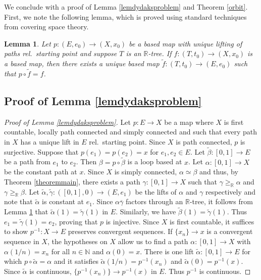 \documentclass[12pt, leqno]{amsart}
\newcommand{\ui}{[0,1]}
\newcommand{\wt}{\widetilde}
\newcommand{\bbn}{\mathbb{N}}
\newcommand{\bbr}{\mathbb{R}}
\newcommand{\ov}{\overline}
\newtheorem{lemma}[theorem]{Lemma}
\theoremstyle{definition}\newtheorem{definition}[theorem]{Definition}
\begin{document}
We conclude with a proof of Lemma \ref{lemdydaksproblem} and Theorem \ref{orbit}. First, we note the following lemma, which is proved using standard techniques from covering space theory.

\begin{lemma}\label{dendriteliftlemma}
Let $p:(E,e_0)\to (X,x_0)$ be a based map with unique lifting of paths rel.\ starting point and suppose $T$ is an $\bbr$-tree. If $f:(T,t_0)\to (X,x_0)$ is a based map, then there exists a unique based map $\wt{f}:(T,t_0)\to (E,e_0)$ such that $p\circ \wt{f}=f$.
\end{lemma}

\subsection{Proof of Lemma \ref{lemdydaksproblem}}

\begin{proof}[Proof of Lemma \ref{lemdydaksproblem}]
Let $p:E\to X$ be a map where $X$ is first countable, locally path connected and simply connected and such that every path in $X$ has a unique lift in $E$ rel.\ starting point. Since $X$ is path connected, $p$ is surjective. Suppose that $p(e_1)=p(e_2)=x$ for $e_1,e_2\in E$. Let $\wt{\beta}:\ui\to E$ be a path from $e_1$ to $e_2$. Then $\beta=p\circ\wt{\beta}$ is a loop based at $x$. Let $\alpha:\ui\to X$ be the constant path at $x$. Since $X$ is simply connected, $\alpha\simeq \beta$ and thus, by Theorem \ref{theoremmain}, there exists a path $\gamma:\ui\to X$ such that $\gamma\geq_{\bbr}\alpha$ and $\gamma\geq_{\bbr} \beta$. Let $\wt{\alpha},\wt{\gamma}:(\ui,0)\to (E,e_1)$ be the lifts of $\alpha$ and $\gamma$ respectively and note that $\wt{\alpha}$ is constant at $e_1$. Since $\alpha\ov{\gamma}$ factors through an $\bbr$-tree, it follows from Lemma \ref{dendriteliftlemma} that $\wt{\alpha}(1)=\wt{\gamma}(1)$ in $E$. Similarly, we have $\wt{\beta}(1)=\wt{\gamma}(1)$. Thus $e_1=\wt{\gamma}(1)=e_2$, proving that $p$ is injective. Since $X$ is first countable, it suffices to show $p^{-1}:X\to E$ preserves convergent sequences. If $\{x_n\}\to x$ is a convergent sequence in $X$, the hypotheses on $X$ allow us to find a path $\alpha:\ui\to X$ with $\alpha(1/n)=x_n$ for all $n\in\bbn$ and $\alpha(0)=x$. There is one lift $\wt{\alpha}:\ui\to E$ for which $p\circ\wt{\alpha}=\alpha$ and it satisfies $\wt{\alpha}(1/n)=p^{-1}(x_n)$ and $\wt{\alpha}(0)=p^{-1}(x)$. Since $\wt{\alpha}$ is continuous, $\{p^{-1}(x_n)\}\to p^{-1}(x)$ in $E$. Thus $p^{-1}$ is continuous.
\end{proof}
\end{document}

